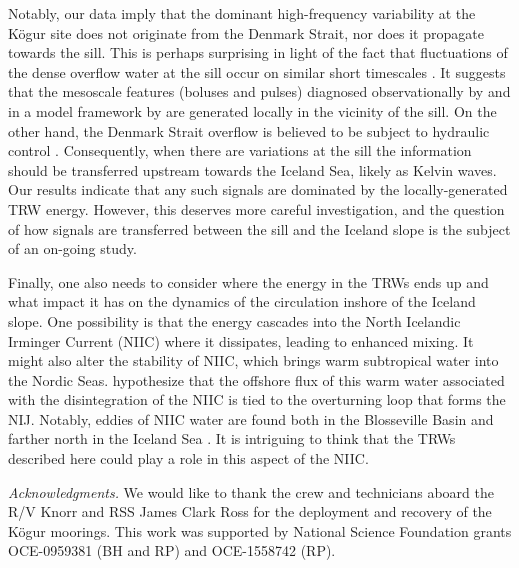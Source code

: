 \documentclass[12pt,titlepage,figuresatend]{article}
\begin{document}
Notably, our data imply that the dominant high-frequency variability at the K\"{o}gur site does not originate from the Denmark Strait, nor does it propagate towards the sill. This is perhaps surprising in light of the fact that fluctuations of the dense overflow water at the sill occur on similar short timescales \cite[]{Jochumsen2017}. It suggests that the mesoscale features (boluses and pulses) diagnosed observationally by \cite{Appen2017} and in a model framework by \cite{Almansi2017} are generated locally in the vicinity of the sill. On the other hand, the Denmark Strait overflow is believed to be subject to hydraulic control \cite[]{Whitehead1998,Nikolopoulos2003}. Consequently, when there are variations at the sill the information should be transferred upstream towards the Iceland Sea, likely as Kelvin waves. Our results indicate that any such signals are dominated by the locally-generated TRW energy. However, this deserves more careful investigation, and the question of how signals are transferred between the sill and the Iceland slope is the subject of an on-going study. 

Finally, one also needs to consider where the energy in the TRWs ends up and what impact it has on the dynamics of
the circulation inshore of the Iceland slope. One possibility is that the energy cascades into the North Icelandic Irminger Current (NIIC) where it dissipates, leading to enhanced mixing. It might also alter the stability of NIIC, which brings warm subtropical water into the Nordic Seas. \cite[]{Vage2011} hypothesize that the offshore flux of this warm water associated with the disintegration of the NIIC is tied to the overturning loop that forms the NIJ. Notably, eddies of NIIC water are found both in the Blosseville Basin \cite[]{Jonsson2012} and farther north in the Iceland Sea \cite[]{Vage2011}. It is intriguing to think that the TRWs described here could play a role in this aspect of the NIIC. 


\bigskip
\emph{Acknowledgments.}
We would like to thank the crew and technicians aboard the R/V Knorr and RSS James Clark Ross for the deployment and recovery of the K\"{o}gur moorings. This work was supported by National Science Foundation grants OCE-0959381 (BH and RP) and OCE-1558742 (RP). 




\end{document}
